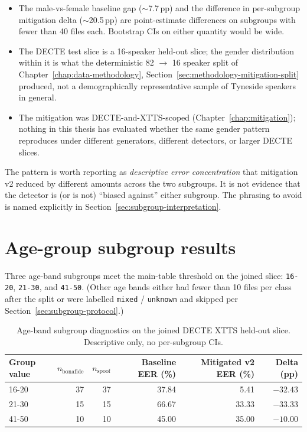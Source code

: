 \begin{itemize}
    \item The male-vs-female baseline gap ($\sim$7.7\,pp) and the difference in
        per-subgroup mitigation delta ($\sim$20.5\,pp) are point-estimate
        differences on subgroups with fewer than 40 files each. Bootstrap
        CIs on either quantity would be wide.
    \item The DECTE test slice is a 16-speaker held-out slice; the gender
        distribution within it is what the deterministic 82 $\rightarrow$ 16 speaker
        split of Chapter~\ref{chap:data-methodology}, Section~\ref{sec:methodology-mitigation-split} produced, not a demographically
        representative sample of Tyneside speakers in general.
    \item The mitigation was DECTE-and-XTTS-scoped (Chapter~\ref{chap:mitigation}); nothing in
        this thesis has evaluated whether the same gender pattern
        reproduces under different generators, different detectors, or
        larger DECTE slices.
\end{itemize}

The pattern is worth reporting as \emph{descriptive error concentration}
that mitigation v2 reduced by different amounts across the two
subgroups. It is not evidence that the detector is (or is not)
``biased against'' either subgroup. The phrasing to avoid is named
explicitly in Section~\ref{sec:subgroup-interpretation}.


\section{Age-group subgroup results}
\label{sec:subgroup-age}

Three age-band subgroups meet the main-table threshold on the
joined slice: \texttt{16-20}, \texttt{21-30}, and \texttt{41-50}. (Other age bands
either had fewer than 10 files per class after the split or were
labelled \texttt{mixed} / \texttt{unknown} and skipped per Section~\ref{sec:subgroup-protocol}.)

\begin{table}[t]
\centering
\caption{Age-band subgroup diagnostics on the joined DECTE XTTS held-out slice. Descriptive only, no per-subgroup CIs.}
\label{tab:subgroup-age}
\scriptsize
\setlength{\tabcolsep}{4pt}
\begin{tabularx}{\linewidth}{X r r r r r}
\toprule
\textbf{Group value} & \textbf{$n_\text{bonafide}$} & \textbf{$n_\text{spoof}$} & \textbf{Baseline EER (\%)} & \textbf{Mitigated v2 EER (\%)} & \textbf{Delta (pp)} \\
\midrule
16-20 & 37 & 37 & 37.84 & 5.41  & $\mathbf{-32.43}$ \\
21-30 & 15 & 15 & 66.67 & 33.33 & $\mathbf{-33.33}$ \\
41-50 & 10 & 10 & 45.00 & 35.00 & $-10.00$ \\
\bottomrule
\end{tabularx}
\end{table}

